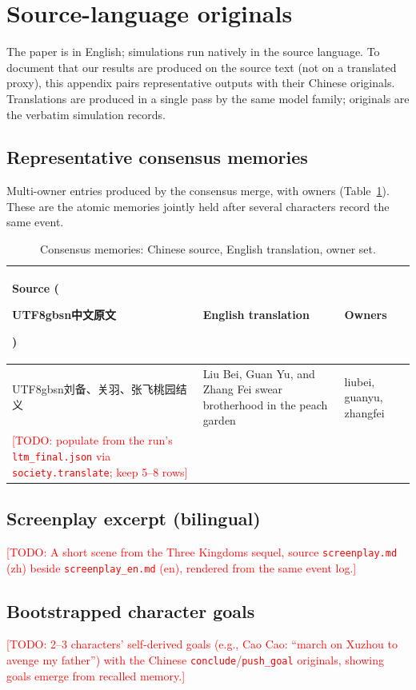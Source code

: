 \documentclass[11pt]{article}
\newcommand{\todo}[1]{\textcolor{red}{[TODO: #1]}}
\begin{document}
\appendix

\section{Source-language originals}
\label{app:examples}
The paper is in English; simulations run natively in the source language.
To document that our results are produced on the source text (not on a
translated proxy), this appendix pairs representative outputs with their
Chinese originals. Translations are produced in a single pass by the same
model family; originals are the verbatim simulation records.

\subsection{Representative consensus memories}
\label{app:consensus}
Multi-owner entries produced by the consensus merge, with owners
(Table~\ref{tab:app-mem}). These are the atomic memories jointly held after
several characters record the same event.
\begin{table}[h]
\centering\small
\begin{tabular}{p{4.2cm}p{4.6cm}p{3.2cm}}
\toprule
Source (\begin{CJK}{UTF8}{gbsn}中文原文\end{CJK}) & English translation & Owners \\
\midrule
\begin{CJK}{UTF8}{gbsn}刘备、关羽、张飞桃园结义\end{CJK} &
Liu Bei, Guan Yu, and Zhang Fei swear brotherhood in the peach garden &
liubei, guanyu, zhangfei \\
\todo{populate from the run's \texttt{ltm\_final.json} via
\texttt{society.translate}; keep 5--8 rows} & & \\
\bottomrule
\end{tabular}
\caption{Consensus memories: Chinese source, English translation, owner set.}
\label{tab:app-mem}
\end{table}

\subsection{Screenplay excerpt (bilingual)}
\label{app:screenplay}
\todo{A short scene from the Three Kingdoms sequel, source \texttt{screenplay.md}
(zh) beside \texttt{screenplay\_en.md} (en), rendered from the same event log.}

\subsection{Bootstrapped character goals}
\label{app:goals}
\todo{2--3 characters' self-derived goals (e.g., Cao Cao: ``march on Xuzhou to
avenge my father'') with the Chinese \texttt{conclude}/\texttt{push\_goal}
originals, showing goals emerge from recalled memory.}
\end{document}
